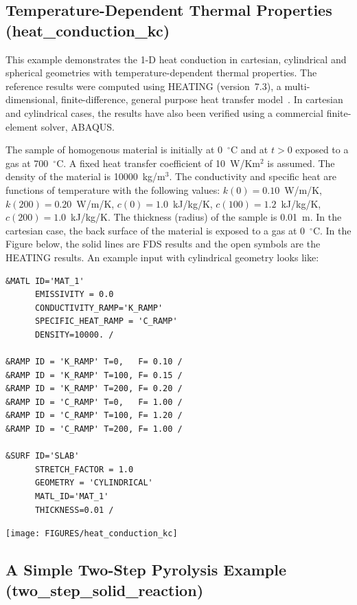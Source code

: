 \documentclass[11pt]{book}
\begin{document}
\clearpage

\subsection{Temperature-Dependent Thermal Properties ({\bf heat\_conduction\_kc})}
\label{heat_conduction_kc}

This example demonstrates the 1-D heat conduction in cartesian,
cylindrical and spherical geometries with temperature-dependent
thermal properties. The reference results were computed using
HEATING (version~7.3), a multi-dimensional, finite-difference, general purpose heat transfer model~\cite{Childs}. In
cartesian and cylindrical cases, the results have also  been verified
using a commercial finite-element solver, ABAQUS.

The sample of homogenous material is initially at 0~$^\circ$C and
at $t>0$ exposed to a gas at 700~$^\circ$C. A fixed heat transfer
coefficient of 10~W/Km$^2$ is assumed. The density
of the material is 10000~kg/m$^3$. The conductivity and specific heat
are functions of temperature with the following values: $k(0)=0.10$~W/m/K,
$k(200)=0.20$~W/m/K, $c(0)=1.0$~kJ/kg/K, $c(100)=1.2$~kJ/kg/K,
$c(200)=1.0$~kJ/kg/K. The thickness (radius) of the sample is 0.01~m. In the
cartesian case, the back surface of the material is exposed to a gas
at 0~$^\circ$C. In the Figure below, the solid lines are FDS results and the open
symbols are the HEATING results. An example input with cylindrical
geometry looks like:

\scriptsize
\begin{verbatim}
&MATL ID='MAT_1'
      EMISSIVITY = 0.0
      CONDUCTIVITY_RAMP='K_RAMP'
      SPECIFIC_HEAT_RAMP = 'C_RAMP'
      DENSITY=10000. /

&RAMP ID = 'K_RAMP' T=0,   F= 0.10 /
&RAMP ID = 'K_RAMP' T=100, F= 0.15 /
&RAMP ID = 'K_RAMP' T=200, F= 0.20 /
&RAMP ID = 'C_RAMP' T=0,   F= 1.00 /
&RAMP ID = 'C_RAMP' T=100, F= 1.20 /
&RAMP ID = 'C_RAMP' T=200, F= 1.00 /

&SURF ID='SLAB'
      STRETCH_FACTOR = 1.0
      GEOMETRY = 'CYLINDRICAL'
      MATL_ID='MAT_1'
      THICKNESS=0.01 /
\end{verbatim} \normalsize

\noindent
\begin{center}
\texttt{[image: FIGURES/heat\_conduction\_kc]}
\end{center}


\subsection{A Simple Two-Step Pyrolysis Example ({\bf two\_step\_solid\_reaction}) }
\label{two_step_solid_reaction}
\end{document}
